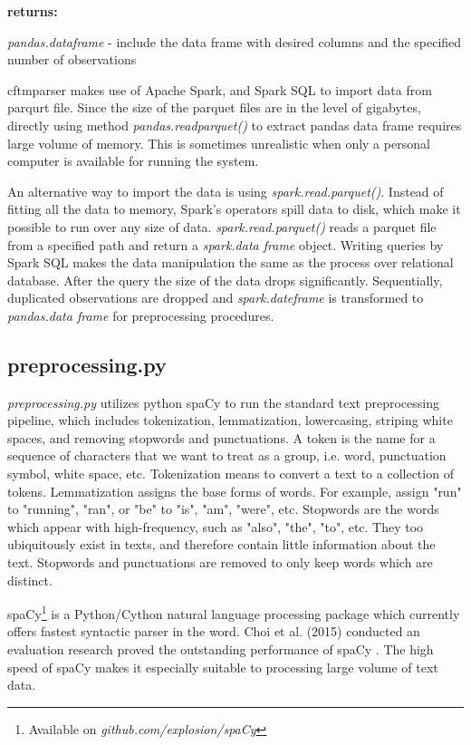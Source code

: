 \documentclass{article} %
\begin{document}
\textbf{returns:}
\begin{compactitem}
      \item \textit{pandas.dataframe} - include the data frame with desired columns and the specified number of observations 
\end{compactitem}


cftm\textunderscore{}parser makes use of Apache Spark, and Spark SQL to import data from parqurt file. Since the size of the parquet files are in the level of gigabytes, directly using method \textit{pandas.read\textunderscore{}parquet()} to extract pandas data frame requires large volume of memory. This is sometimes unrealistic when only a personal computer is available for running the system. 

An alternative way to import the data is using \textit{spark.read.parquet()}. Instead of fitting all the data to memory, Spark's operators spill data to disk, which make it possible to run over any size of data. \textit{spark.read.parquet()} reads a parquet file from a specified path and return a \textit{spark.data frame} object. Writing queries by Spark SQL makes the data manipulation the same as the process over relational database. After the query the size of the data drops significantly. Sequentially, duplicated observations are dropped and \textit{spark.dateframe} is transformed to \textit{pandas.data frame} for preprocessing procedures.

\subsection{preprocessing.py}
\textit{preprocessing.py} utilizes python spaCy to run the standard text preprocessing pipeline, which includes tokenization, lemmatization, lowercasing, striping white spaces, and removing stopwords and punctuations. A token is the name for a sequence of characters that we want to treat as a group, i.e. word, punctuation symbol, white space, etc. Tokenization means to convert a text to a collection of tokens. Lemmatization assigns the base forms of words. For example, assign "run" to "running", "ran", or "be" to "is", "am", "were", etc. Stopwords are the words which appear with high-frequency, such as "also", "the", "to", etc. They too ubiquitously exist in texts, and therefore contain little information about the text. Stopwords and punctuations are removed to only keep words which are distinct.

spaCy\footnote{Available on \textit{github.com/explosion/spaCy}} is a Python/Cython natural language processing package which currently offers fastest syntactic parser in the word. Choi et al. (2015) conducted an evaluation research proved the outstanding performance of spaCy \cite{choi_it_2015}. The high speed of spaCy makes it especially suitable to processing large volume of text data.
\end{document}
